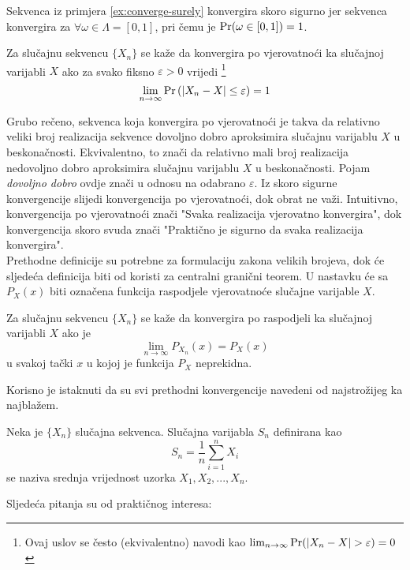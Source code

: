 Sekvenca iz primjera \ref{ex:converge-surely} konvergira skoro sigurno jer
sekvenca konvergira za $\forall \omega \in \Lambda = [0,1]$, pri čemu je
$\mathrm{Pr}(\omega \in [0,1]) = 1$.

\begin{definition}
  Za slučajnu sekvencu $\{X_n\}$ se kaže da konvergira po vjerovatnoći ka
  slučajnoj varijabli $X$ ako za svako fiksno $\varepsilon > 0$ vrijedi
  \footnote{
    Ovaj uslov se često (ekvivalentno) navodi kao
    $\lim_{n\to\infty} \pr(|X_n-X|>\varepsilon) = 0$
  }
  \begin{equation}
    \lim_{n\to\infty} \mathrm{Pr}\left(|X_n - X| \le \varepsilon\right) = 1
  \end{equation}
\end{definition}

Grubo rečeno, sekvenca koja konvergira po vjerovatnoći je takva da relativno
veliki broj realizacija sekvence dovoljno dobro aproksimira slučajnu varijablu
$X$ u beskonačnosti. Ekvivalentno, to znači da relativno mali broj realizacija
nedovoljno dobro aproksimira slučajnu varijablu $X$ u beskonačnosti. Pojam
\textit{dovoljno dobro} ovdje znači u odnosu na odabrano $\varepsilon$. Iz skoro
sigurne konvergencije slijedi konvergencija po vjerovatnoći, dok obrat ne važi.
Intuitivno, konvergencija po vjerovatnoći znači "Svaka realizacija vjerovatno
konvergira", dok konvergencija skoro svuda znači "Praktično je sigurno da svaka
realizacija konvergira". \\

Prethodne definicije su potrebne za formulaciju zakona velikih brojeva, dok će
sljedeća definicija biti od koristi za centralni granični teorem.  U nastavku će
sa $P_X(x)$ biti označena funkcija raspodjele vjerovatnoće slučajne varijable
$X$.

\begin{definition}
  Za slučajnu sekvencu $\{X_n\}$ se kaže da konvergira po raspodjeli ka
  slučajnoj varijabli $X$ ako je
  \begin{equation}
    \lim_{n\to\infty} P_{X_n}(x) = P_X(x)
  \end{equation}
  u svakoj tački $x$ u kojoj je funkcija $P_X$ neprekidna.
\end{definition}

Korisno je istaknuti da su svi prethodni konvergencije navedeni od najstrožijeg
ka najblažem.

\begin{definition}

  Neka je $\{X_n\}$ slučajna sekvenca. Slučajna varijabla $S_n$
  definirana kao 
  \begin{equation} \label{eq:sample-mean}
    S_n = \frac{1}{n} \sum_{i=1}^{n} X_i
  \end{equation}
  se naziva srednja vrijednost uzorka $X_1,X_2,...,X_n$.

\end{definition}
%
Sljedeća pitanja su od praktičnog interesa:

